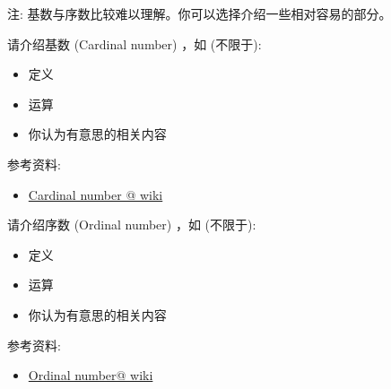 \documentclass[a4paper, justified]{tufte-handout}
\begin{document}
\beginoptional

\begin{problem}[UD Problem 24.15]
\end{problem}

\begin{solution}
\end{solution}

\beginot

注: 基数与序数比较难以理解。你可以选择介绍一些相对容易的部分。
\begin{ot}[基数]
  请介绍基数 (Cardinal number) ，如 (不限于):
  \begin{itemize}
    \item 定义
    \item 运算
    \item 你认为有意思的相关内容
  \end{itemize}

  \noindent 参考资料:
  \begin{itemize}
    \item \href{https://en.wikipedia.org/wiki/Cardinal\_number}{Cardinal number @ wiki}
  \end{itemize}
\end{ot}

\vspace{0.50cm}
\begin{ot}[序数]
  请介绍序数 (Ordinal number) ，如 (不限于):
  \begin{itemize}
    \item 定义
    \item 运算
    \item 你认为有意思的相关内容
  \end{itemize}

  \noindent 参考资料:
  \begin{itemize}
    \item \href{https://en.wikipedia.org/wiki/Ordinal\_number}{Ordinal number@ wiki}
  \end{itemize}
\end{ot}

\end{document}
